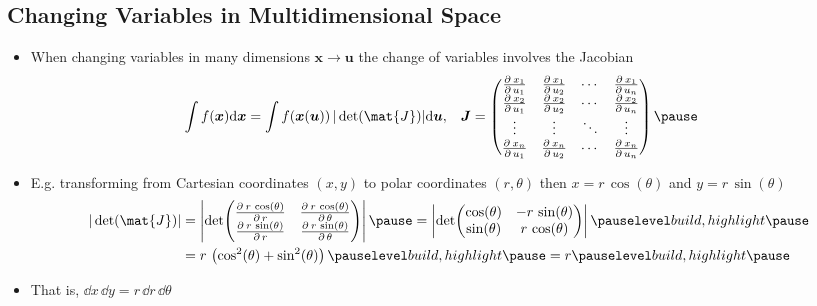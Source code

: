 \begin{slide}
  \section[-2]{Changing Variables in Multidimensional Space}

\begin{PauseHighLight}
  \begin{itemize}
  \item When changing variables in many dimensions $\bm{x} \rightarrow
    \bm{u}$ the change of variables involves the Jacobian
    {\small
    \begin{align*}
      \int f(\bm{x}) \dd \bm{x}
      &= \int f(\bm{x}(\bm{u})) \, |\det(\mat{J})| \dd \bm{u},
        & \bm{J} &=
          \begin{pmatrix}
            \pd{x_1}{u_1} & \pd{x_1}{u_2} & \cdots & \pd{x_1}{u_n} \\
            \pd{x_2}{u_1} & \pd{x_2}{u_2} & \cdots & \pd{x_2}{u_n} \\
            \vdots & \vdots & \ddots & \vdots  \\
            \pd{x_n}{u_1} & \pd{x_n}{u_2} & \cdots & \pd{x_n}{u_n}
          \end{pmatrix}\pause
    \end{align*}}
  \item E.g. transforming from Cartesian coordinates $(x,y)$ to polar
    coordinates $(r,\theta)$ then $x=r\,\cos(\theta)$ and
    $y=r\,\sin(\theta)$
    {\small
    \begin{align*}
      |\det(\mat{J})| &= \left| \det\!\begin{pmatrix}
            \pd{r\,\cos(\theta)}{r} &  \pd{r\,\cos(\theta)}{\theta}  \\
            \pd{r\,\sin(\theta)}{r} &  \pd{r\,\sin(\theta)}{\theta}  \\
          \end{pmatrix} \right| \pause
    = \left| \det\!\begin{pmatrix}
            \cos(\theta) &  -r\,\sin(\theta)  \\
            \sin(\theta) &  r\,\cos(\theta)  \\
                   \end{pmatrix} \right| \pauseb\\
      &= r\,\bra{\cos^2(\theta) + \sin^2(\theta)}\pauseb = r \pauseb
    \end{align*}}
\item  That is, $\dd x\, \dd y = r\,\dd r\, \dd \theta$\pauseb
  \end{itemize}
\end{PauseHighLight}

\end{slide}

